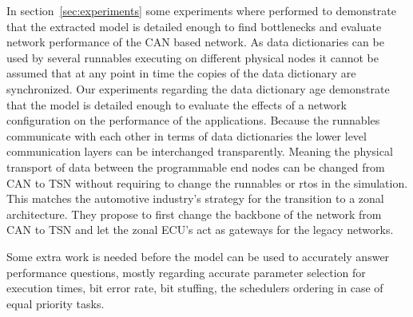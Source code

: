In section~\ref{sec:experiments} some experiments where performed to demonstrate that the extracted model is detailed enough to find bottlenecks and evaluate network performance of the CAN based network. As data dictionaries can be used by several runnables executing on different physical nodes it cannot be assumed that at any point in time the copies of the data dictionary are synchronized. Our experiments regarding the data dictionary age demonstrate that the model is detailed enough to evaluate the effects of a network configuration on the performance of the applications. Because the runnables communicate with each other in terms of data dictionaries the lower level communication layers can be interchanged transparently. Meaning the physical transport of data between the programmable end nodes can be changed from CAN to TSN without requiring to change the runnables or rtos in the simulation. This matches the automotive industry's strategy for the transition to a zonal architecture. They propose to first change the backbone of the network from CAN to TSN and let the zonal ECU's act as gateways for the legacy networks.

Some extra work is needed before the model can be used to accurately answer performance questions, mostly regarding accurate parameter selection for execution times, bit error rate, bit stuffing, the schedulers ordering in case of equal priority tasks.